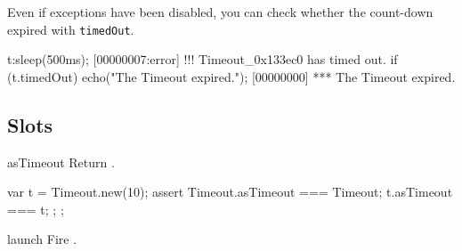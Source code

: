 Even if exceptions have been disabled, you can check whether the
count-down expired with \lstinline|timedOut|.

\begin{urbiscript}
t:sleep(500ms);
[00000007:error] !!! Timeout_0x133ec0 has timed out.
if (t.timedOut)
  echo("The Timeout expired.");
[00000000] *** The Timeout expired.
\end{urbiscript}

\subsection{Slots}
\begin{urbiscriptapi}
\item[asTimeout] Return \this.
\begin{urbiscript}
{
  var t = Timeout.new(10);
  assert
  {
    Timeout.asTimeout === Timeout;
          t.asTimeout === t;
  };
};
\end{urbiscript}

\item[launch]
  Fire \this.

\end{urbiscriptapi}


